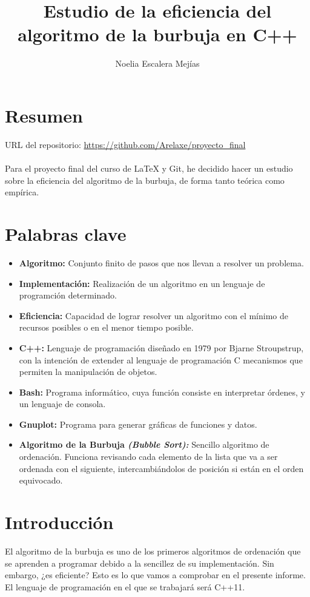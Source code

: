 \documentclass[a4paper,11pt]{article}
\begin{document}
\title{Estudio de la eficiencia del algoritmo de la burbuja en C++}
\author{Noelia Escalera Mejías}
\date{}
\maketitle
\section{Resumen}
URL del repositorio:
\url{https://github.com/Arelaxe/proyecto_final}
\\ \\
Para el proyecto final del curso de LaTeX y Git, he decidido hacer un estudio sobre la eficiencia del algoritmo de la burbuja, de forma tanto teórica como empírica.
\section{Palabras clave}
\begin{itemize}
\item {\bf Algoritmo:} Conjunto finito de pasos que nos llevan a resolver un problema.
\item {\bf Implementación:} Realización de un algoritmo en un lenguaje de programción determinado.
\item {\bf Eficiencia:} Capacidad de lograr resolver un algoritmo con el mínimo de recursos posibles o en el menor tiempo posible.
\item {\bf C++:} Lenguaje de programación diseñado en 1979 por Bjarne Stroupstrup, con la intención de extender al lenguaje de programación C mecanismos que permiten la manipulación de objetos.
\item {\bf Bash:} Programa informático, cuya función consiste en interpretar órdenes, y un lenguaje de consola.
\item {\bf Gnuplot:} Programa para generar gráficas de funciones y datos.
\item {\bf Algoritmo de la Burbuja \it (Bubble Sort):} Sencillo algoritmo de ordenación. Funciona revisando cada elemento de la lista que va a ser ordenada con el siguiente, intercambiándolos de posición si están en el orden equivocado.
\end{itemize}
\section{Introducción}
El algoritmo de la burbuja es uno de los primeros algoritmos de ordenación que se aprenden a programar debido a la sencillez de su implementación. Sin embargo, ¿es eficiente? Esto es lo que vamos a comprobar en el presente informe. El lenguaje de programación en el que se trabajará será C++11.
\end{document}
